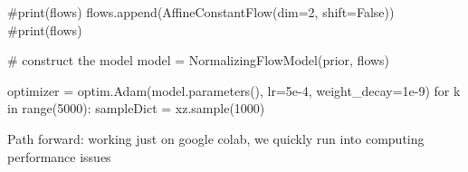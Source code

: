 #print(flows)
flows.append(AffineConstantFlow(dim=2, shift=False))
#print(flows)


# construct the model
model = NormalizingFlowModel(prior, flows)

optimizer = optim.Adam(model.parameters(), lr=5e-4, weight\_decay=1e-9)
for k in range(5000):
    sampleDict = xz.sample(1000)
    

 Path forward:
 working just on google colab, we quickly run into computing performance issues
 \fi
 
 \fi
 

